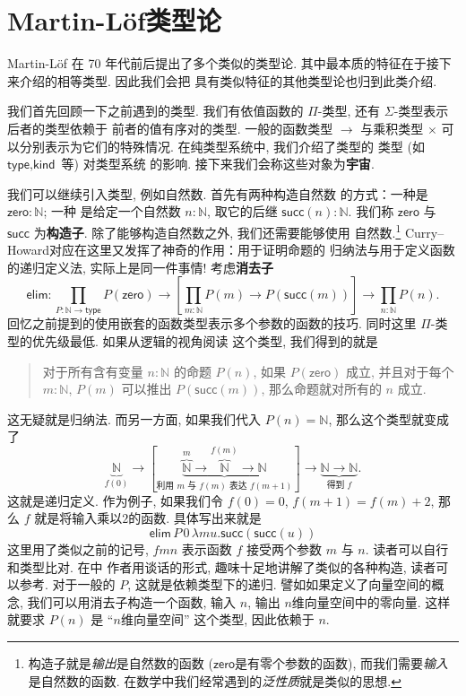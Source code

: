 \documentclass[UTF8]{ctexbook}
\newcommand{\cons}[1]{\textsf{#1}}
\theoremstyle{plain}
\theoremstyle{definition}
\theoremstyle{remark}
\begin{document}
\chapter{Martin-L\"of类型论}\label{martinlof}

Martin-L\"of 在 70 年代前后提出了多个类似的类型论.
其中最本质的特征在于接下来介绍的相等类型. 因此我们会把
具有类似特征的其他类型论也归到此类介绍.

我们首先回顾一下之前遇到的类型. 我们有依值函数的
\(\Pi\)-类型, 还有 \(\Sigma\)-类型表示后者的类型依赖于
前者的值有序对的类型. 一般的函数类型 \(\to\) 与乘积类型
\(\times\) 可以分别表示为它们的特殊情况.
在纯类型系统中, 我们介绍了类型的
类型 (如 \(\cons{type}, \cons{kind}\) 等) 对类型系统
的影响. 接下来我们会称这些对象为\textbf{宇宙}.

我们可以继续引入类型, 例如自然数. 首先有两种构造自然数
的方式：一种是 \(\cons{zero} : \mathbb N\); 一种
是给定一个自然数 \(n : \mathbb N\), 取它的后继
\(\cons{succ}(n) : \mathbb N\). 我们称
\(\cons{zero}\) 与 \(\cons{succ}\) 为\textbf{构造子}.
除了能够构造自然数之外, 我们还需要能够使用
自然数.\footnote{构造子就是\emph{输出}是自然数的函数
(\(\cons{zero}\)是有零个参数的函数), 而我们需要\emph{输入}是自然数的函数.
在数学中我们经常遇到的\emph{泛性质}就是类似的思想.}
Curry--Howard对应在这里又发挥了神奇的作用：用于证明命题的
归纳法与用于定义函数的递归定义法, 实际上是同一件事情!
考虑\textbf{消去子}
\[\cons{elim} :
\prod_{P : \mathbb N \to \cons{type}}
P(\cons{zero}) \to
\left[\prod_{m : \mathbb N} P(m) \to P(\cons{succ}(m))\right]
\to \prod_{n : \mathbb N} P(n).\]
回忆之前提到的使用嵌套的函数类型表示多个参数的函数的技巧.
同时这里 \(\Pi\)-类型的优先级最低. 如果从逻辑的视角阅读
这个类型, 我们得到的就是
\begin{quotation}
对于所有含有变量 \(n : \mathbb N\) 的命题 \(P(n)\),
如果 \(P(\cons{zero})\) 成立, 并且对于每个
\(m : \mathbb N\), \(P(m)\) 可以推出 \(P(\cons{succ}(m))\),
那么命题就对所有的 \(n\) 成立.
\end{quotation}
这无疑就是归纳法. 而另一方面, 如果我们代入 \(P(n) = \mathbb N\),
那么这个类型就变成了
\[\underbrace{\mathbb N}_{f(0)} \to
[\underbrace{\overbrace{\mathbb N}^{m} \to \overbrace{\mathbb N}^{f(m)} \to \mathbb N}
_{\text{利用 \(m\) 与 \(f(m)\) 表达 \(f(m+1)\)}}] \to
\underbrace{\mathbb N \to \mathbb N}_{\text{得到 \(f\)}}.\]
这就是递归定义. 作为例子, 如果我们令
\(f(0) = 0\), \(f(m+1) = f(m)+2\), 那么
\(f\) 就是将输入乘以\(2\)的函数. 具体写出来就是
\[\cons{elim}\, P\,0\,\lambda m u. \cons{succ}(\cons{succ}(u))\]
这里用了类似之前的记号, \(fmn\) 表示函数 \(f\) 接受两个参数 \(m\) 与 \(n\).
读者可以自行和类型比对. 在\cite{friedman:2018:typer}中
作者用谈话的形式, 趣味十足地讲解了类似的各种构造,
读者可以参考. 对于一般的 \(P\), 这就是依赖类型下的递归.
譬如如果定义了向量空间的概念, 我们可以用消去子构造一个函数,
输入 \(n\), 输出 \(n\)维向量空间中的零向量. 这样就要求
\(P(n)\) 是 “\(n\)维向量空间” 这个类型, 因此依赖于 \(n\).
\end{document}
